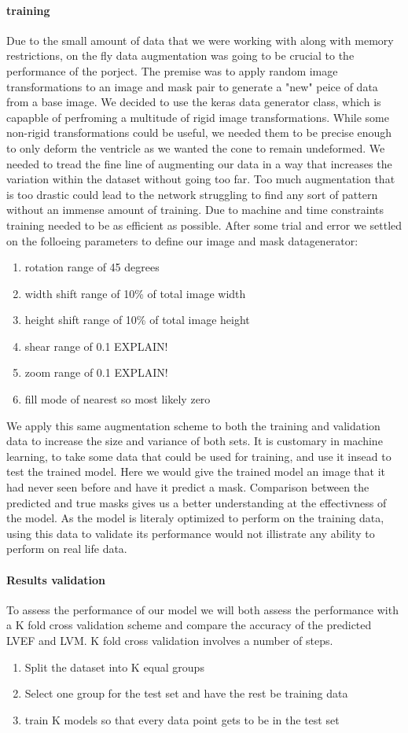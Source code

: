 \documentclass{article}
\begin{document}
\paragraph{training}
Due to the small amount of data that we were working with along with memory restrictions, on the fly data augmentation was going to be crucial to the performance of the porject.
The premise was to apply random image transformations to an image and mask pair to generate a "new" peice of data from a base image.
We decided to use the keras data generator class, which is capapble of perfroming a multitude of rigid image transformations. 
While some non-rigid transformations could be useful, we needed them to be precise enough to only deform the ventricle as we wanted the cone to remain undeformed.
We needed to tread the fine line of augmenting our data in a way that increases the variation within the dataset without going too far.
Too much augmentation that is too drastic could lead to the network struggling to find any sort of pattern without an immense amount of training.
Due to machine and time constraints training needed to be as efficient as possible.
After some trial and error we settled on the folloeing parameters to define our image and mask datagenerator:
\begin{enumerate}
	\item{rotation range of 45 degrees}
	\item{width shift range of 10\% of total image width}
	\item{height shift range of 10\% of total image height}
	\item{shear range of 0.1 EXPLAIN!}
	\item{zoom range of 0.1 EXPLAIN!}
	\item{fill mode of nearest so most likely zero}
\end{enumerate}
We apply this same augmentation scheme to both the training and validation data to increase the size and variance of both sets.
It is customary in machine learning, to take some data that could be used for training, and use it insead to test the trained model.
Here we would give the trained model an image that it had never seen before and have it predict a mask.
Comparison between the predicted and true masks gives us a better understanding at the effectivness of the model.
As the model is literaly optimized to perform on the training data, using this data to validate its performance would not illistrate any ability to perform on real life data.
\paragraph{Results validation}
To assess the performance of our model we will both assess the performance with a K fold cross validation scheme and compare the accuracy of the predicted LVEF and LVM.
K fold cross validation involves a number of steps.
\begin{enumerate}
	\item{Split the dataset into K equal groups}
	\item{Select one group for the test set and have the rest be training data}
	\item{train K models so that every data point gets to be in the test set}
\end{enumerate}
\end{document}
